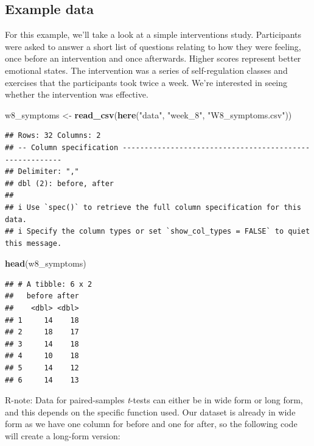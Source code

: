 \documentclass[
]{book}
\newenvironment{Shaded}{\begin{snugshade}}{\end{snugshade}}
\newcommand{\FunctionTok}[1]{\textcolor[rgb]{0.13,0.29,0.53}{\textbf{#1}}}
\newcommand{\NormalTok}[1]{#1}
\newcommand{\OtherTok}[1]{\textcolor[rgb]{0.56,0.35,0.01}{#1}}
\newcommand{\StringTok}[1]{\textcolor[rgb]{0.31,0.60,0.02}{#1}}
\begin{document}
\subsection{Example data}\label{example-data-2}

For this example, we'll take a look at a simple interventions study. Participants were asked to answer a short list of questions relating to how they were feeling, once before an intervention and once afterwards. Higher scores represent better emotional states. The intervention was a series of self-regulation classes and exercises that the participants took twice a week. We're interested in seeing whether the intervention was effective.

\begin{Shaded}
\begin{Highlighting}[]
\NormalTok{w8\_symptoms }\OtherTok{\textless{}{-}} \FunctionTok{read\_csv}\NormalTok{(}\FunctionTok{here}\NormalTok{(}\StringTok{"data"}\NormalTok{, }\StringTok{"week\_8"}\NormalTok{, }\StringTok{"W8\_symptoms.csv"}\NormalTok{))}
\end{Highlighting}
\end{Shaded}

\begin{verbatim}
## Rows: 32 Columns: 2
## -- Column specification --------------------------------------------------------
## Delimiter: ","
## dbl (2): before, after
## 
## i Use `spec()` to retrieve the full column specification for this data.
## i Specify the column types or set `show_col_types = FALSE` to quiet this message.
\end{verbatim}

\begin{Shaded}
\begin{Highlighting}[]
\FunctionTok{head}\NormalTok{(w8\_symptoms)}
\end{Highlighting}
\end{Shaded}

\begin{verbatim}
## # A tibble: 6 x 2
##   before after
##    <dbl> <dbl>
## 1     14    18
## 2     18    17
## 3     14    18
## 4     10    18
## 5     14    12
## 6     14    13
\end{verbatim}

R-note: Data for paired-samples \emph{t}-tests can either be in wide form or long form, and this depends on the specific function used. Our dataset is already in wide form as we have one column for before and one for after, so the following code will create a long-form version:
\end{document}
